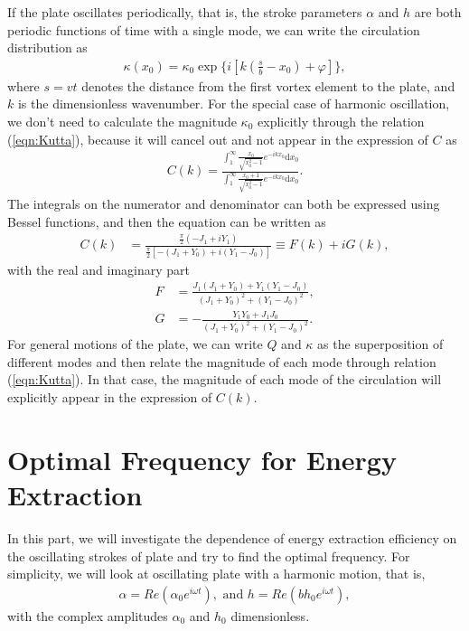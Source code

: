 If the plate oscillates periodically, that is, the stroke parameters $\alpha$ and $h$ are both periodic functions of time with a single mode, we can write the circulation distribution as
\begin{align}
\kappa(x_0) = \kappa_0 \exp \{i[k(\frac{s}{b}-x_0)+ \varphi] \},
\end{align}
where $s = vt$ denotes the distance from the first vortex element to the plate, and $k$ is the dimensionless wavenumber.
For the special case of harmonic oscillation, we don't need to calculate the magnitude $\kappa_0$ explicitly through the relation (\ref{eqn:Kutta}), because it will cancel out and not appear in the expression of $C$ as
\begin{align}
C(k) = \frac{\int_{1}^{\infty} \frac{x_0}{\sqrt{x_0^2-1}} e^{-ikx_0} \mathrm{d}x_0}{\int_{1}^{\infty} \frac{x_0+1}{\sqrt{x_0^2-1}} e^{-ikx_0} \mathrm{d}x_0}.
\end{align}
The integrals on the numerator and denominator can both be expressed using Bessel functions, and then the equation can be written as
\begin{align}
C(k) & =  \frac{\frac{\pi}{2}(-J_1+iY_1)}{\frac{\pi}{2}[-(J_1+Y_0)+i(Y_1-J_0)]}
          \equiv  F(k) + iG(k),
\end{align}
with the real and imaginary part
\begin{align}
F & = \frac{J_1(J_1+Y_0)+Y_1(Y_1-J_0)}{(J_1+Y_0)^2+(Y_1-J_0)^2},  \\
G & = -\frac{Y_1Y_0+J_1J_0}{(J_1+Y_0)^2+(Y_1-J_0)^2}.
\end{align}
For general motions of the plate, we can write $Q$  and $\kappa$ as the superposition of different modes and then relate the magnitude of each mode through relation (\ref{eqn:Kutta}). In that case, the magnitude of each mode of the circulation will explicitly appear in the expression of $C(k)$.


\section{Optimal Frequency for Energy Extraction}

In this part, we will investigate the dependence of energy extraction efficiency on the oscillating strokes of plate and try to find the optimal frequency.
For simplicity, we will look at oscillating plate with a harmonic motion, that is,
\begin{align}
\alpha = Re(\alpha_0 e^{i\omega t}),    \text{    and   }        h = Re(b h_0 e^{i\omega t}),
\end{align}
with the complex amplitudes $\alpha_0$ and $h_0$ dimensionless.

